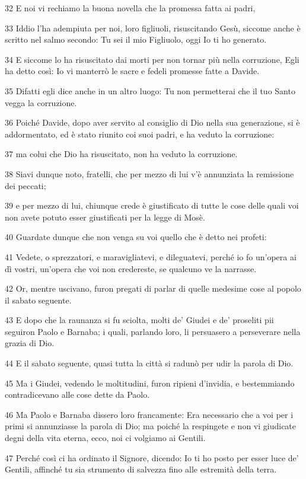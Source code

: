 \par 32 E noi vi rechiamo la buona novella che la promessa fatta ai padri,
\par 33 Iddio l'ha adempiuta per noi, loro figliuoli, risuscitando Gesù, siccome anche è scritto nel salmo secondo: Tu sei il mio Figliuolo, oggi Io ti ho generato.
\par 34 E siccome lo ha risuscitato dai morti per non tornar più nella corruzione, Egli ha detto così: Io vi manterrò le sacre e fedeli promesse fatte a Davide.
\par 35 Difatti egli dice anche in un altro luogo: Tu non permetterai che il tuo Santo vegga la corruzione.
\par 36 Poiché Davide, dopo aver servito al consiglio di Dio nella sua generazione, si è addormentato, ed è stato riunito coi suoi padri, e ha veduto la corruzione:
\par 37 ma colui che Dio ha risuscitato, non ha veduto la corruzione.
\par 38 Siavi dunque noto, fratelli, che per mezzo di lui v'è annunziata la remissione dei peccati;
\par 39 e per mezzo di lui, chiunque crede è giustificato di tutte le cose delle quali voi non avete potuto esser giustificati per la legge di Mosè.
\par 40 Guardate dunque che non venga su voi quello che è detto nei profeti:
\par 41 Vedete, o sprezzatori, e maravigliatevi, e dileguatevi, perché io fo un'opera ai dì vostri, un'opera che voi non credereste, se qualcuno ve la narrasse.
\par 42 Or, mentre uscivano, furon pregati di parlar di quelle medesime cose al popolo il sabato seguente.
\par 43 E dopo che la raunanza si fu sciolta, molti de' Giudei e de' proseliti pii seguiron Paolo e Barnaba; i quali, parlando loro, li persuasero a perseverare nella grazia di Dio.
\par 44 E il sabato seguente, quasi tutta la città si radunò per udir la parola di Dio.
\par 45 Ma i Giudei, vedendo le moltitudini, furon ripieni d'invidia, e bestemmiando contradicevano alle cose dette da Paolo.
\par 46 Ma Paolo e Barnaba dissero loro francamente: Era necessario che a voi per i primi si annunziasse la parola di Dio; ma poiché la respingete e non vi giudicate degni della vita eterna, ecco, noi ci volgiamo ai Gentili.
\par 47 Perché così ci ha ordinato il Signore, dicendo: Io ti ho posto per esser luce de' Gentili, affinché tu sia strumento di salvezza fino alle estremità della terra.
